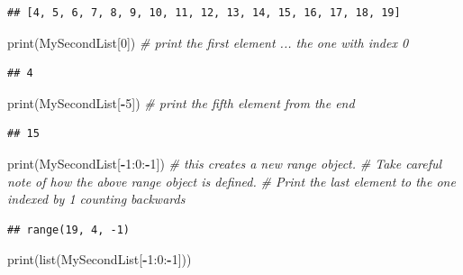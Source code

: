 \documentclass[
]{book}
\newenvironment{Shaded}{\begin{snugshade}}{\end{snugshade}}
\newcommand{\BuiltInTok}[1]{#1}
\newcommand{\CommentTok}[1]{\textcolor[rgb]{0.56,0.35,0.01}{\textit{#1}}}
\newcommand{\DecValTok}[1]{\textcolor[rgb]{0.00,0.00,0.81}{#1}}
\newcommand{\NormalTok}[1]{#1}
\newcommand{\OperatorTok}[1]{\textcolor[rgb]{0.81,0.36,0.00}{\textbf{#1}}}
\theoremstyle{definition}
\theoremstyle{definition}
\theoremstyle{definition}
\theoremstyle{remark}
\begin{document}
\begin{verbatim}
## [4, 5, 6, 7, 8, 9, 10, 11, 12, 13, 14, 15, 16, 17, 18, 19]
\end{verbatim}

\begin{Shaded}
\begin{Highlighting}[]
\BuiltInTok{print}\NormalTok{(MySecondList[}\DecValTok{0}\NormalTok{]) }\CommentTok{\# print the first element ... the one with index 0}
\end{Highlighting}
\end{Shaded}

\begin{verbatim}
## 4
\end{verbatim}

\begin{Shaded}
\begin{Highlighting}[]
\BuiltInTok{print}\NormalTok{(MySecondList[}\OperatorTok{{-}}\DecValTok{5}\NormalTok{]) }\CommentTok{\# print the fifth element from the end}
\end{Highlighting}
\end{Shaded}

\begin{verbatim}
## 15
\end{verbatim}

\begin{Shaded}
\begin{Highlighting}[]
\BuiltInTok{print}\NormalTok{(MySecondList[}\OperatorTok{{-}}\DecValTok{1}\NormalTok{:}\DecValTok{0}\NormalTok{:}\OperatorTok{{-}}\DecValTok{1}\NormalTok{]) }\CommentTok{\# this creates a new range object.  }
\CommentTok{\# Take careful note of how the above range object is defined.}
\CommentTok{\# Print the last element to the one indexed by 1 counting backwards}
\end{Highlighting}
\end{Shaded}

\begin{verbatim}
## range(19, 4, -1)
\end{verbatim}

\begin{Shaded}
\begin{Highlighting}[]
\BuiltInTok{print}\NormalTok{(}\BuiltInTok{list}\NormalTok{(MySecondList[}\OperatorTok{{-}}\DecValTok{1}\NormalTok{:}\DecValTok{0}\NormalTok{:}\OperatorTok{{-}}\DecValTok{1}\NormalTok{])) }
\end{Highlighting}
\end{Shaded}
\end{document}
